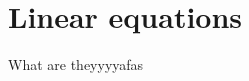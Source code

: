 \documentclass{article}
\begin{document}
\section{Linear equations}
What are theyyyyafas
\end{document}
